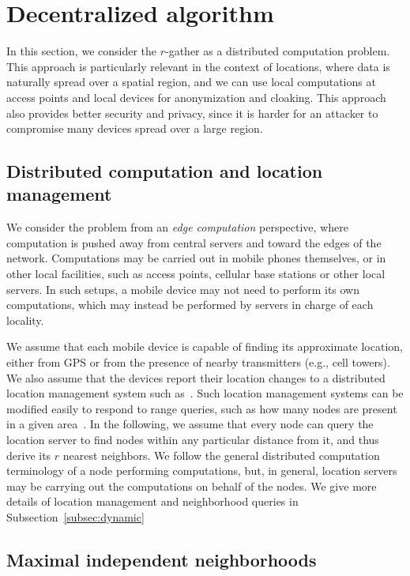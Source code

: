 
\section{Decentralized algorithm}


In this section, we consider the $r$-gather as a distributed computation problem. This approach is particularly relevant in the context of locations, where data is naturally spread over a spatial region, and we can use local computations at access points and local devices for anonymization and cloaking. This approach also provides better security and privacy, since it is harder for an attacker to compromise many devices spread over a large region.

\subsection{Distributed computation and location management}

We consider the problem from an {\em edge computation} perspective, where computation is pushed away from central servers and toward the edges of the network. Computations may be carried out in mobile phones themselves, or in other local facilities, such as access points, cellular base stations or other local servers. In such setups, a mobile device may not need to perform its own computations, which may instead be performed by servers in charge of each locality. 

We assume that each mobile device is capable of finding its approximate location, either from GPS or from the presence of nearby transmitters (e.g., cell towers). We also assume that the devices report their location changes to a distributed location management system such as~\cite{abraham04LLS}. Such location management systems can be modified easily to respond to range queries, such as how many nodes are present in a given area~\cite{Sarkar:2010:forms}. In the following, we assume that every node can query the location server to find nodes within any particular distance from it, and thus derive its $r$ nearest neighbors. We follow the general distributed computation terminology of a node performing computations, but,  in general, location servers may be carrying out the computations on behalf of the nodes. We give more details of location management and neighborhood queries in Subsection~\ref{subsec:dynamic}


\subsection{Maximal independent neighborhoods}


